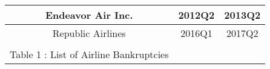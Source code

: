 \documentclass[12pt, letterpaper]{article}
\begin{document}
\begin{table}[h]
\begin{tabular}{ccc}
\multicolumn{1}{|c|}{Endeavor Air Inc.}     & \multicolumn{1}{c|}{2012Q2}                                                  & \multicolumn{1}{c|}{2013Q2}                                                  \\ \hline
\multicolumn{1}{|c|}{Republic Airlines}     & \multicolumn{1}{c|}{2016Q1}                                                  & \multicolumn{1}{c|}{2017Q2}                                                  \\ \hline
\multicolumn{1}{l}{}                        & \multicolumn{1}{l}{}                                                         & \multicolumn{1}{l}{}                                               \\  Table 1 : List of Airline Bankruptcies
\end{tabular}
\end{table}

\newpage

\cite{mcurie_radium}
\cite{ncurie_radium}
\cite{ocurie_radium}



\end{document}

